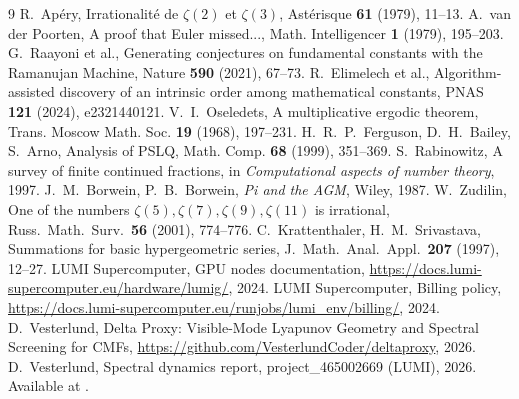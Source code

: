 \documentclass[11pt]{article}
\begin{document}
\begin{thebibliography}{9}
 R.~Ap\'ery, Irrationalit\'e de $\zeta(2)$ et $\zeta(3)$, Ast\'erisque \textbf{61} (1979), 11--13.
 A.~van der Poorten, A proof that Euler missed..., Math. Intelligencer \textbf{1} (1979), 195--203.
 G.~Raayoni et al., Generating conjectures on fundamental constants with the Ramanujan Machine, Nature \textbf{590} (2021), 67--73.
 R.~Elimelech et al., Algorithm-assisted discovery of an intrinsic order among mathematical constants, PNAS \textbf{121} (2024), e2321440121.
 V.~I.~Oseledets, A multiplicative ergodic theorem, Trans. Moscow Math. Soc. \textbf{19} (1968), 197--231.
 H.~R.~P.~Ferguson, D.~H.~Bailey, S.~Arno, Analysis of PSLQ, Math. Comp. \textbf{68} (1999), 351--369.
 S.~Rabinowitz, A survey of finite continued fractions, in \emph{Computational aspects of number theory}, 1997.
 J.~M.~Borwein, P.~B.~Borwein, \emph{Pi and the AGM}, Wiley, 1987.
 W.~Zudilin, One of the numbers $\zeta(5), \zeta(7), \zeta(9), \zeta(11)$ is irrational, Russ.~Math.~Surv.~\textbf{56} (2001), 774--776.
 C.~Krattenthaler, H.~M.~Srivastava, Summations for basic hypergeometric series, J.~Math.~Anal.~Appl.~\textbf{207} (1997), 12--27.
 LUMI Supercomputer, GPU nodes documentation, \url{https://docs.lumi-supercomputer.eu/hardware/lumig/}, 2024.
 LUMI Supercomputer, Billing policy, \url{https://docs.lumi-supercomputer.eu/runjobs/lumi_env/billing/}, 2024.
 D.~Vesterlund, Delta Proxy: Visible-Mode Lyapunov Geometry and Spectral Screening for CMFs, \url{https://github.com/VesterlundCoder/deltaproxy}, 2026.
 D.~Vesterlund, Spectral dynamics report, project\_465002669 (LUMI), 2026. Available at \cite{deltaproxy_repo}.
\end{thebibliography}
\end{document}
